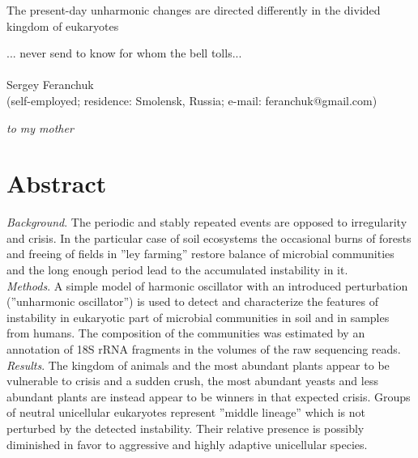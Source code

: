 \documentclass[a4paper]{article}
\begin{document}
\begin{center}
{\Large{The present-day unharmonic changes are directed differently in the divided kingdom of eukaryotes}}
\vskip 5pt
\end{center}
{\small{... never send to know for whom the bell tolls...} }\\
\\
{Sergey Feranchuk}\\
{\small(self-employed; residence: Smolensk, Russia; e-mail: feranchuk@gmail.com)}
\vskip 5pt

\begin{flushright}
\small{ \textit{to my mother}}
\end{flushright}

\section*{Abstract}

\textit{Background}. The periodic and stably repeated events are opposed to irregularity and crisis. In the particular case of soil ecosystems the occasional burns of forests and freeing of fields in ''ley farming'' restore balance of microbial communities and the long enough period lead to the accumulated instability in it.\\
\textit{Methods}. A simple model of harmonic oscillator with an introduced perturbation (''unharmonic oscillator'') is used to detect and characterize the features of instability in eukaryotic part of microbial communities in soil and in samples from humans. The composition of the communities was estimated by an annotation of 18S rRNA fragments in the volumes of the raw sequencing reads. \\
\textit{Results}. The kingdom of animals and the most abundant plants appear to be vulnerable to crisis and a sudden crush, the most abundant yeasts and less abundant plants are instead appear to be winners in that expected crisis. Groups of neutral unicellular eukaryotes represent ''middle lineage'' which is not perturbed by the detected instability. Their relative presence is possibly diminished in favor to aggressive and highly adaptive unicellular species.



\clearpage
\end{document}
